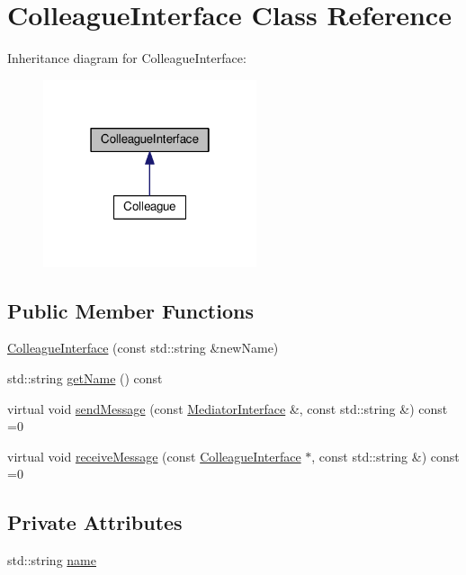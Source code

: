 \hypertarget{classColleagueInterface}{}\section{Colleague\+Interface Class Reference}
\label{classColleagueInterface}


Inheritance diagram for Colleague\+Interface\+:
\nopagebreak
\begin{figure}[H]
\begin{center}
\leavevmode
\includegraphics[width=178pt]{classColleagueInterface__inherit__graph}
\end{center}
\end{figure}
\subsection*{Public Member Functions}
\begin{DoxyCompactItemize}
\item 
\hyperlink{classColleagueInterface_a1615c154b4c9f05d7c35793acc170696}{Colleague\+Interface} (const std\+::string \&new\+Name)
\item 
std\+::string \hyperlink{classColleagueInterface_acbc50603b8b5f9e94f36bb94a53fd651}{get\+Name} () const 
\item 
virtual void \hyperlink{classColleagueInterface_a1b86fdff9280809073590a466280fd06}{send\+Message} (const \hyperlink{classMediatorInterface}{Mediator\+Interface} \&, const std\+::string \&) const =0
\item 
virtual void \hyperlink{classColleagueInterface_ad54da6a768fff80244b2f81af95cdbc1}{receive\+Message} (const \hyperlink{classColleagueInterface}{Colleague\+Interface} $\ast$, const std\+::string \&) const =0
\end{DoxyCompactItemize}
\subsection*{Private Attributes}
\begin{DoxyCompactItemize}
\item 
std\+::string \hyperlink{classColleagueInterface_aa5a767ee2b42271eadf388956525831b}{name}
\end{DoxyCompactItemize}


